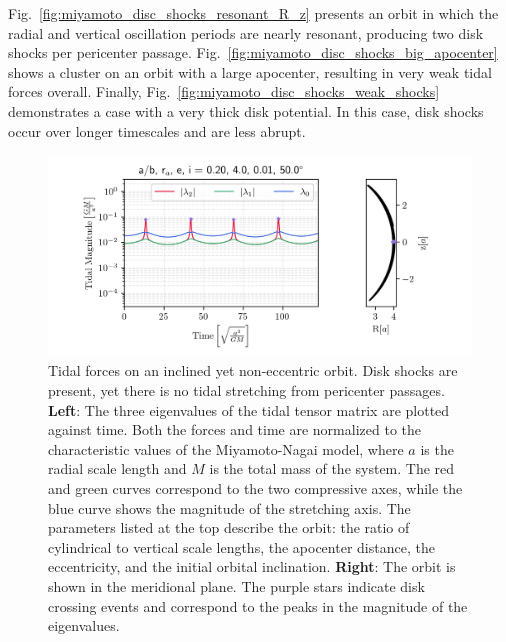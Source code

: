             Fig.~\ref{fig:miyamoto_disc_shocks_resonant_R_z} presents an orbit in which the radial and vertical oscillation periods are nearly resonant, producing two disk shocks per pericenter passage. Fig.~\ref{fig:miyamoto_disc_shocks_big_apocenter} shows a cluster on an orbit with a large apocenter, resulting in very weak tidal forces overall. Finally, Fig.~\ref{fig:miyamoto_disc_shocks_weak_shocks} demonstrates a case with a very thick disk potential. In this case, disk shocks occur over longer timescales and are less abrupt.
            \begin{figure}
                \centering
                \includegraphics[width=.9\linewidth]{images/miyamoto_disc_shocks_ab_rp_e_i_0.20_4.0_0.01_50.0.png}
                \caption[Tidal forces on an inclined circular orbit]{Tidal forces on an inclined yet non-eccentric orbit. Disk shocks are present, yet there is no tidal stretching from pericenter passages. \textbf{Left}: The three eigenvalues of the tidal tensor matrix are plotted against time. Both the forces and time are normalized to the characteristic values of the Miyamoto-Nagai model, where $a$ is the radial scale length and $M$ is the total mass of the system. The red and green curves correspond to the two compressive axes, while the blue curve shows the magnitude of the stretching axis. The parameters listed at the top describe the orbit: the ratio of cylindrical to vertical scale lengths, the apocenter distance, the eccentricity, and the initial orbital inclination. \textbf{Right}: The orbit is shown in the meridional plane. The purple stars indicate disk crossing events and correspond to the peaks in the magnitude of the eigenvalues. }
                \label{fig:miyamoto_disc_shocks_circular_inclined_orbit}
            \end{figure}

